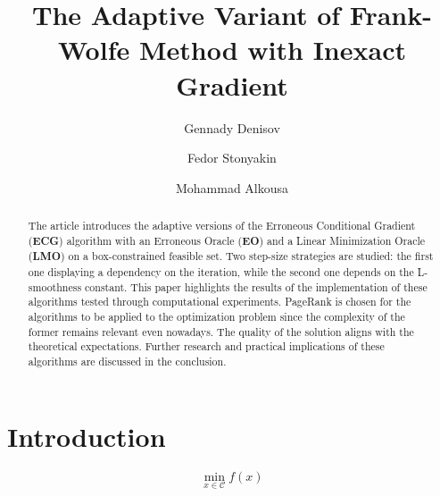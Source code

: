 \documentclass[runningheads, draft]{llncs}
\begin{document}
%
\title{The Adaptive Variant of Frank-Wolfe Method with Inexact Gradient}
%
\author{Gennady Denisov \and
    Fedor Stonyakin \and
    Mohammad Alkousa}
%
%
\maketitle
%
\begin{abstract}
    The article introduces the adaptive versions of the Erroneous Conditional
    Gradient (\textbf{ECG}) algorithm with an Erroneous Oracle (\textbf{EO})
    and a Linear Minimization Oracle (\textbf{LMO}) on a box-constrained
    feasible set. Two step-size strategies are studied: the first one displaying
    a dependency on the iteration, while the second one depends on the
    L-smoothness constant. This paper highlights the results of the
    implementation of these algorithms tested through computational
    experiments. PageRank is chosen for the algorithms to be applied to the
    optimization problem since the complexity of the former remains relevant
    even nowadays. The quality of the solution aligns with the theoretical
    expectations. Further research and practical implications of these
    algorithms are discussed in the conclusion.

\end{abstract}
%
\section{Introduction}
%
\begin{equation}\label{eq:optimization-problem}
    \min_{x \in \mathcal{C}} f(x)\tag{P}
\end{equation}
%
\end{document}
